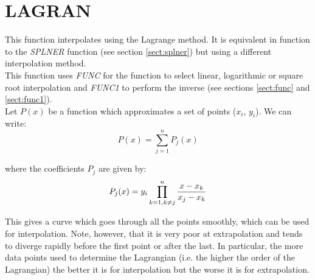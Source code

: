 \section{LAGRAN}
\label{sect:lagran}

\noindent This function interpolates using the Lagrange method. It is
equivalent in function to the {\em SPLNER} function (see section
\ref{sect:splner}) but using a different interpolation method.\\

\noindent This function uses {\em FUNC} for the function to select linear,
logarithmic or square root interpolation and {\em FUNC1} to perform the
inverse (see sections \ref{sect:func} and \ref{sect:func1}).\\

\noindent Let $P(x)$ be a function which approximates a set of points
($x_i$, $y_i$). We can write:\\

\begin{equation}
P(x) = \sum_{j = 1}^n P_j(x)
\end{equation}

\noindent where the coefficients $P_j$ are given by:\\

\begin{equation}
P_j(x) = y_i \prod_{k = 1 , k \ne j}^n {x - x_k \over x_j - x_k}
\end{equation}

\noindent This gives a curve which goes through all the points smoothly,
which can be used for interpolation. Note, however, that it is very poor at
extrapolation and tends to diverge rapidly before the first point or after
the last. In particular, the more data points used to determine the
Lagrangian (i.e. the higher the order of the Lagrangian) the better it is
for interpolation but the worse it is for extrapolation.\\
